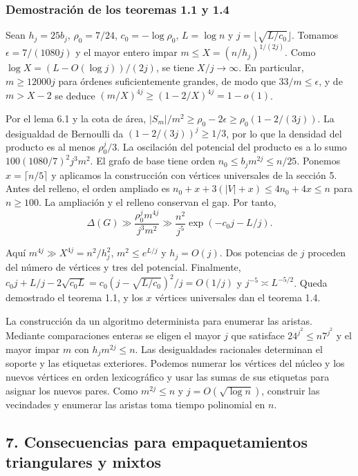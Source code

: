 \documentclass[spanish,11pt,a4paper]{article}
\begin{document}
\subsubsection{Demostración de los teoremas 1.1 y 1.4}\label{demostraciuxf3n-de-los-teoremas-1.1-y-1.4}

Sean \(h_j=25b_j\), \(\rho_0=7/24\), \(c_0=-\log\rho_0\), \(L=\log n\) y \(j=\lfloor\sqrt{L/c_0}\rfloor\). Tomamos \(\epsilon=7/(1080j)\) y el mayor entero impar \(m\le X=(n/h_j)^{1/(2j)}\). Como \(\log X=(L-O(\log j))/(2j)\), se tiene \(X/j\to\infty\). En particular, \(m\ge12000j\) para órdenes suficientemente grandes, de modo que \(33/m\le\epsilon\), y de \(m>X-2\) se deduce \((m/X)^{4j}\ge(1-2/X)^{4j}=1-o(1)\).

Por el lema 6.1 y la cota de área, \(|S_m|/m^2\ge\rho_0-2\epsilon\ge\rho_0(1-2/(3j))\). La desigualdad de Bernoulli da \((1-2/(3j))^j\ge1/3\), por lo que la densidad del producto es al menos \(\rho_0^j/3\). La oscilación del potencial del producto es a lo sumo \(100(1080/7)^2j^3m^2\). El grafo de base tiene orden \(n_0\le b_jm^{2j}\le n/25\). Ponemos \(x=\lceil n/5\rceil\) y aplicamos la construcción con vértices universales de la sección 5. Antes del relleno, el orden ampliado es \(n_0+x+3(|V|+x)\le4n_0+4x\le n\) para \(n\ge100\). La ampliación y el relleno conservan el gap. Por tanto,
\[\Delta(G)\gg\frac{\rho_0^j m^{4j}}{j^3m^2}
 \gg\frac{n^2}{j^5}\exp(-c_0j-L/j).\]

Aquí \(m^{4j}\gg X^{4j}=n^2/h_j^2\), \(m^2\le e^{L/j}\) y \(h_j=O(j)\). Dos potencias de \(j\) proceden del número de vértices y tres del potencial. Finalmente, \(c_0j+L/j-2\sqrt{c_0L}=c_0(j-\sqrt{L/c_0})^2/j=O(1/j)\) y \(j^{-5}\asymp L^{-5/2}\). Queda demostrado el teorema 1.1, y los \(x\) vértices universales dan el teorema 1.4.

La construcción da un algoritmo determinista para enumerar las aristas. Mediante comparaciones enteras se eligen el mayor \(j\) que satisface \(24^{j^2}\le n7^{j^2}\) y el mayor impar \(m\) con \(h_jm^{2j}\le n\). Las desigualdades racionales determinan el soporte y las etiquetas exteriores. Podemos numerar los vértices del núcleo y los nuevos vértices en orden lexicográfico y usar las sumas de sus etiquetas para asignar los nuevos pares. Como \(m^{2j}\le n\) y \(j=O(\sqrt{\log n})\), construir las vecindades y enumerar las aristas toma tiempo polinomial en \(n\).

\subsection{7. Consecuencias para empaquetamientos triangulares y mixtos}\label{consecuencias-para-empaquetamientos-triangulares-y-mixtos}
\end{document}
